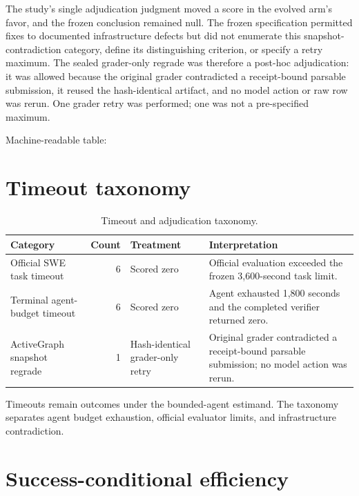 \documentclass[10pt,twocolumn]{article}
\begin{document}
The study's single adjudication judgment moved a score in the evolved
arm's favor, and the frozen conclusion remained null. The frozen
specification permitted fixes to documented infrastructure defects but
did not enumerate this snapshot-contradiction category, define its
distinguishing criterion, or specify a retry maximum. The sealed
grader-only regrade was therefore a post-hoc adjudication: it was
allowed because the original grader contradicted a receipt-bound
parsable submission, it reused the hash-identical artifact, and no model
action or raw row was rerun. One grader retry was performed; one was not
a pre-specified maximum.

Machine-readable table:

\section{Timeout taxonomy}\label{b.-timeout-taxonomy}

\begin{table}[!ht]
\caption{Timeout and adjudication taxonomy.}
\label{tab:timeouts}
\centering\tiny
\begin{tabularx}{\columnwidth}{@{}p{}r p{}X@{}}
\toprule
\textbf{Category} & \textbf{Count} & \textbf{Treatment} & \textbf{Interpretation}\\
\midrule
Official SWE task timeout & 6 & Scored zero & Official evaluation exceeded the frozen 3,600-second task limit.\\
Terminal agent-budget timeout & 6 & Scored zero & Agent exhausted 1,800 seconds and the completed verifier returned zero.\\
ActiveGraph snapshot regrade & 1 & Hash-identical grader-only retry & Original grader contradicted a receipt-bound parsable submission; no model action was rerun.\\
\bottomrule
\end{tabularx}
\end{table}

Timeouts remain outcomes under the bounded-agent estimand. The taxonomy
separates agent budget exhaustion, official evaluator limits, and
infrastructure contradiction.

\section{Success-conditional efficiency}\label{c.-success-conditional-efficiency}
\end{document}
